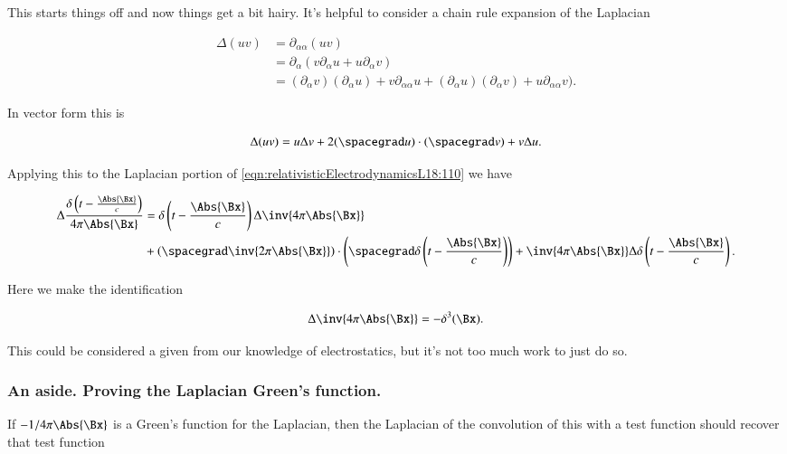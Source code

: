 This starts things off and now things get a bit hairy.  It's helpful to consider a chain rule expansion of the Laplacian

\begin{align*}
\Delta (u v)
&=
\partial_{\alpha\alpha} (u v) \\
&=
\partial_{\alpha} (
v \partial_\alpha u
+ u\partial_\alpha v
) \\
&=
(\partial_\alpha v) (\partial_\alpha u ) + v \partial_{\alpha\alpha} u
+(\partial_\alpha u) (\partial_\alpha v ) + u \partial_{\alpha\alpha} v
).
\end{align*}

In vector form this is

\begin{equation}\label{eqn:relativisticElectrodynamicsL18:130}
\Delta (u v) = u \Delta v + 2 (\spacegrad u) \cdot (\spacegrad v) + v \Delta u.
\end{equation}

Applying this to the Laplacian portion of \ref{eqn:relativisticElectrodynamicsL18:110} we have

\begin{equation}\label{eqn:relativisticElectrodynamicsL18:131}
\begin{aligned}
\Delta \frac{\delta\left(t - \frac{\Abs{\Bx}}{c}\right)}{4 \pi \Abs{\Bx} } 
&=
\delta\left(t - \frac{\Abs{\Bx}}{c}\right)
\Delta
\inv{4 \pi \Abs{\Bx} } \\
&+\left(\spacegrad \inv{2 \pi \Abs{\Bx} }\right)
\cdot
\left(
\spacegrad
\delta\left(t - \frac{\Abs{\Bx}}{c}\right) \right)
+
\inv{4 \pi \Abs{\Bx} }
\Delta
\delta\left(t - \frac{\Abs{\Bx}}{c}\right).
\end{aligned}
\end{equation}

Here we make the identification

\begin{equation}\label{eqn:relativisticElectrodynamicsL18:132}
\Delta \inv{4 \pi \Abs{\Bx} } = - \delta^3(\Bx).
\end{equation}

This could be considered a given from our knowledge of electrostatics, but it's not too much work to just do so.

\subsubsection{An aside.  Proving the Laplacian Green's function.}

If $-1/{4 \pi \Abs{\Bx} }$ is a Green's function for the Laplacian, then the Laplacian of the convolution of this with a test function should recover that test function

